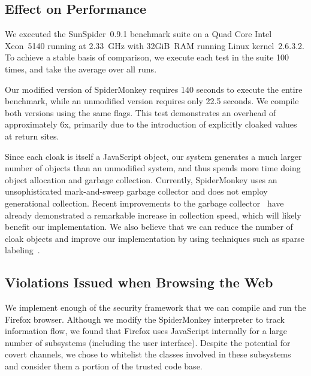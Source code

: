 \subsection{Effect on Performance}
\label{sec:evaluation-performance}

We executed the SunSpider~0.9.1 benchmark suite on a Quad Core Intel Xeon~5140 running at 2.33~GHz with 32GiB~RAM running Linux kernel~2.6.3.2.
To achieve a stable basis of comparison, we execute each test in the suite 100 times, and take the average over all runs.

Our modified version of SpiderMonkey requires 140 seconds to execute the entire benchmark, while an unmodified version requires only 22.5 seconds.
We compile both versions using the same flags.
This test demonstrates an overhead of approximately 6x, primarily due to the introduction of explicitly cloaked values at return sites.

Since each cloak is itself a JavaScript object, our system generates a much larger number of objects than an unmodified system, and thus spends more time doing object allocation and garbage collection.
Currently, SpiderMonkey uses an unsophisticated mark-and-sweep garbage collector and does not employ generational collection.
Recent improvements to the garbage collector~\cite{wagner2011} have already demonstrated a remarkable increase in collection speed, which will likely benefit our implementation.
We also believe that we can reduce the number of cloak objects and improve our implementation by using techniques such as sparse labeling~\cite{1554353,1814220}.


\subsection{Violations Issued when Browsing the Web}
We implement enough of the security framework that we can compile and run the Firefox browser.
Although we modify the SpiderMonkey interpreter to track information flow, we found that Firefox uses JavaScript internally for a large number of subsystems (including the user interface).
Despite the potential for covert channels, we chose to whitelist the classes involved in these subsystems and consider them a portion of the trusted code base.


